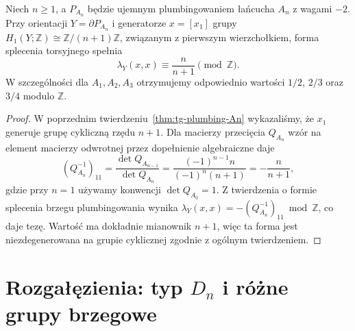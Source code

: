 \begin{center}
\end{center}

\begin{stwierdzenie}
\label{st:tg-plumbing-An-linking}
Niech $n\ge1$, a $P_{A_n}$ będzie ujemnym
plumbingowaniem łańcucha $A_n$ z wagami $-2$.
Przy orientacji $Y=\partial P_{A_n}$
i generatorze $x=[x_1]$ grupy
$H_1(Y;\mathbb Z)\cong\mathbb Z/(n+1)\mathbb Z$,
związanym z pierwszym wierzchołkiem,
forma splecenia torsyjnego spełnia
\[
\lambda_Y(x,x)\equiv\frac{n}{n+1}\pmod{\mathbb Z}.
\]
W szczególności dla $A_1,A_2,A_3$
otrzymujemy odpowiednio wartości
$1/2$, $2/3$ oraz $3/4$ modulo $\mathbb Z$.
\end{stwierdzenie}
\begin{proof}
W poprzednim twierdzeniu~\ref{thm:tg-plumbing-An}
wykazaliśmy, że $x_1$ generuje
grupę cykliczną rzędu $n+1$.
Dla macierzy przecięcia $Q_{A_n}$
wzór na element macierzy odwrotnej
przez dopełnienie algebraiczne daje
\[
(Q_{A_n}^{-1})_{11}
=\frac{\det Q_{A_{n-1}}}{\det Q_{A_n}}
=\frac{(-1)^{n-1}n}{(-1)^n(n+1)}
=-\frac{n}{n+1},
\]
gdzie przy $n=1$ używamy
konwencji $\det Q_{A_0}=1$.
Z twierdzenia o formie splecenia brzegu
plumbingowania wynika
$\lambda_Y(x,x)=-(Q_{A_n}^{-1})_{11}\bmod\mathbb Z$,
co daje tezę. Wartość ma dokładnie
mianownik $n+1$, więc ta forma jest
niezdegenerowana na grupie cyklicznej
zgodnie z ogólnym twierdzeniem.
\end{proof}

\section{Rozgałęzienia: typ \texorpdfstring{$D_n$}{Dn} i różne grupy brzegowe}
\label{sec:tg-plumbing-Dn}

